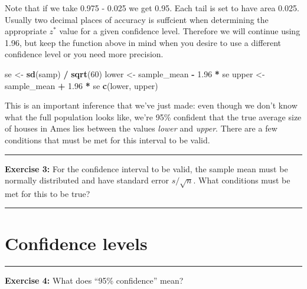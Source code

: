 \documentclass[]{book}
\newenvironment{Shaded}{\begin{snugshade}}{\end{snugshade}}
\newcommand{\DecValTok}[1]{\textcolor[rgb]{0.00,0.00,0.81}{#1}}
\newcommand{\FloatTok}[1]{\textcolor[rgb]{0.00,0.00,0.81}{#1}}
\newcommand{\KeywordTok}[1]{\textcolor[rgb]{0.13,0.29,0.53}{\textbf{#1}}}
\newcommand{\NormalTok}[1]{#1}
\newcommand{\OperatorTok}[1]{\textcolor[rgb]{0.81,0.36,0.00}{\textbf{#1}}}
\newcommand{\StringTok}[1]{\textcolor[rgb]{0.31,0.60,0.02}{#1}}
\theoremstyle{definition}
\theoremstyle{definition}
\theoremstyle{definition}
\theoremstyle{remark}
\begin{document}
Note that if we take 0.975 - 0.025 we get 0.95. Each tail is set to have
area 0.025. Usually two decimal places of accuracy is suffcient when
determining the appropriate \(z^*\) value for a given confidence level.
Therefore we will continue using 1.96, but keep the function above in
mind when you desire to use a different confidence level or you need
more precision.

\begin{Shaded}
\begin{Highlighting}[]
\NormalTok{se <-}\StringTok{ }\KeywordTok{sd}\NormalTok{(samp) }\OperatorTok{/}\StringTok{ }\KeywordTok{sqrt}\NormalTok{(}\DecValTok{60}\NormalTok{)}
\NormalTok{lower <-}\StringTok{ }\NormalTok{sample_mean }\OperatorTok{-}\StringTok{ }\FloatTok{1.96} \OperatorTok{*}\StringTok{ }\NormalTok{se}
\NormalTok{upper <-}\StringTok{ }\NormalTok{sample_mean }\OperatorTok{+}\StringTok{ }\FloatTok{1.96} \OperatorTok{*}\StringTok{ }\NormalTok{se}
\KeywordTok{c}\NormalTok{(lower, upper)}
\end{Highlighting}
\end{Shaded}

This is an important inference that we've just made: even though we
don't know what the full population looks like, we're 95\% confident
that the true average size of houses in Ames lies between the values
\emph{lower} and \emph{upper}. There are a few conditions that must be
met for this interval to be valid.

\begin{center}\rule{0.5\linewidth}{\linethickness}\end{center}

\textbf{Exercise 3:} For the confidence interval to be valid, the sample
mean must be normally distributed and have standard error
\(s / \sqrt{n}.\) What conditions must be met for this to be true?

\begin{center}\rule{0.5\linewidth}{\linethickness}\end{center}

\hypertarget{confidence-levels}{%
\section{Confidence levels}\label{confidence-levels}}

\begin{center}\rule{0.5\linewidth}{\linethickness}\end{center}

\textbf{Exercise 4:} What does ``95\% confidence'' mean?
\end{document}
